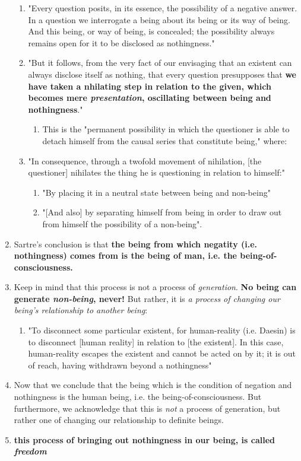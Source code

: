 \begin{enumerate}
  \begin{enumerate}
    \item "Every question posits, in its essence, the possibility of a negative answer. In a question we interrogate a being about its being or its way of being. And this being, or way of being, is concealed; the possibility always remains open for it to be disclosed as nothingness."
    \item "But it follows, from the very fact of our envisaging that an existent can always disclose itself as nothing, that every question presupposes that \textbf{we have taken a nhilating step in relation to the given, which becomes mere \emph{presentation}, oscillating between being and nothingness}." \autocite[59]{sartre}
    \begin{enumerate}
      \item This is the "permanent possibility in which the questioner is able to detach himself from the causal series that constitute being," where:
    \end{enumerate}
    \item "In consequence, through a twofold movement of nihilation, [the questioner] nihilates the thing he is questioning in relation to himself:"
    \begin{enumerate}
      \item "By placing it in a neutral state between being and non-being"
      \item "[And also] by separating himself from being in order to draw out from himself the possibility of a non-being". \autocite[59]{sartre}
    \end{enumerate}
  \end{enumerate}
  \item Sartre's conclusion is that \textbf{the being from which negatity (i.e. nothingness) comes from is the being of man, i.e. the being-of-consciousness.}
  \item Keep in mind that this process is not a process of \emph{generation}. \textbf{No being can generate \emph{non-being}, never!} But rather, it is \emph{a process of changing our being's relationship to another being}:
  \begin{enumerate}
    \item "To disconnect some particular existent, for human-reality (i.e. Daesin) is to disconnect [human reality] in relation to [the existent]. In this case, human-reality escapes the existent and cannot be acted on by it; it is out of reach, having withdrawn beyond a nothingness"
  \end{enumerate}
  \item Now that we conclude that the being which is the condition of negation and nothingness is the human being, i.e. the being-of-consciousness. But furthermore, we acknowledge that this is \emph{not} a process of generation, but rather one of changing our relationship to definite beings.
  \item \textbf{this process of bringing out nothingness in our being, is called \emph{freedom}}


\end{enumerate}
